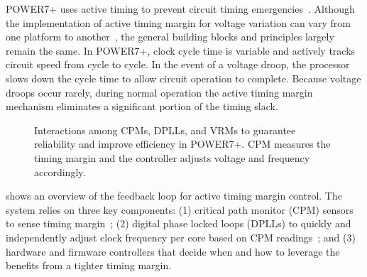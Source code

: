 POWER7+ uses active timing to prevent circuit timing emergencies~\cite{lefurgy2011active,lefurgy2013active,floyd2013runtime}. Although the implementation of active timing margin for voltage variation can vary from one platform to another~\cite{fischer200590nm,tschanz2007adaptive,kurd2008next,lefurgy2011active,bowman201222nm,grenat20145,tokunaga20145,bowman20158}, the general building blocks and principles largely remain the same. 
In POWER7+, clock cycle time is variable and actively tracks circuit speed from cycle to cycle. In the event of a voltage droop, the processor slows down the cycle time to allow circuit operation to complete. Because voltage droops occur rarely, during normal operation the active timing margin mechanism eliminates a significant portion of the timing slack.

\begin{figure}[t]
\centering
{}
\caption{Interactions among CPMs, DPLLs, and VRMs to guarantee reliability and improve efficiency in POWER7+. CPM measures the timing margin and the controller adjusts voltage and frequency accordingly.}
\end{figure}

 shows an overview of the feedback loop for active timing margin control. The system relies on three key components: (1) critical path monitor (CPM) sensors to sense timing margin~\cite{drake2007distributed,drake2013single}; (2) digital phase locked loops (DPLLs) to quickly and independently adjust clock frequency per core based on CPM readings~\cite{tierno2010dpll}; and (3) hardware and firmware controllers that decide when and how to leverage the benefits from a tighter timing margin.

